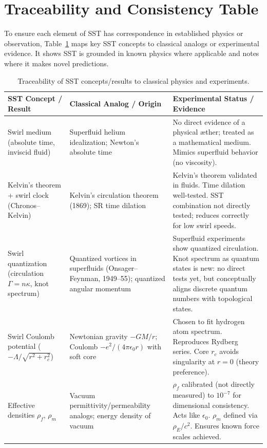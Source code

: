 \documentclass[reprint,aps,onecolumn,nofootinbib]{revtex4-2}
\begin{document}
	\section{Traceability and Consistency Table}
	To ensure each element of SST has correspondence in established physics or observation, Table~\ref{tab:trace} maps key SST concepts to classical analogs or experimental evidence. It shows SST is grounded in known physics where applicable and notes where it makes novel predictions.

	\begin{table}[hbt!]
		\caption{Traceability of SST concepts/results to classical physics and experiments.}
		\label{tab:trace}
        \footnotesize
		\begin{ruledtabular}
			\begin{tabular}{|p{3.0cm} p{4.0cm} p{8.0cm}|}
				\textbf{SST Concept / Result} & \textbf{Classical Analog / Origin} & \textbf{Experimental Status / Evidence} \\
				\hline
				Swirl medium (absolute time, inviscid fluid) & Superfluid helium idealization; Newton’s absolute time & No direct evidence of a physical æther; treated as a mathematical medium. Mimics superfluid behavior (no viscosity). \\
				Kelvin’s theorem + swirl clock (Chronos–Kelvin) & Kelvin’s circulation theorem (1869); SR time dilation & Kelvin’s theorem validated in fluids. Time dilation well-tested. SST combination not directly tested; reduces correctly for low swirl speeds. \\
				Swirl quantization (circulation $\Gamma = n\kappa$, knot spectrum) & Quantized vortices in superfluids (Onsager–Feynman, 1949–55); quantized angular momentum & Superfluid experiments show quantized circulation. Knot spectrum as quantum states is new: no direct tests yet, but conceptually aligns discrete quantum numbers with topological states. \\
				Swirl Coulomb potential ($-\Lambda/\sqrt{r^2+r_c^2}$) & Newtonian gravity $-GM/r$; Coulomb $-e^2/(4\pi\epsilon_0 r)$ with soft core & Chosen to fit hydrogen atom spectrum. Reproduces Rydberg series. Core $r_c$ avoids singularity at $r=0$ (theory preference). \\
				Effective densities $\rho_f$, $\rho_m$ & Vacuum permittivity/permeability analogs; energy density of vacuum & $\rho_f$ calibrated (not directly measured) to $10^{-7}$ for dimensional consistency. Acts like $\epsilon_0$. $\rho_m$ defined via $\rho_E/c^2$. Ensures known force scales achieved. \\

\end{tabular}
\end{ruledtabular}
\end{table}
\end{document}
